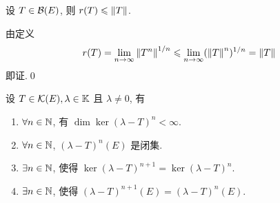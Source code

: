 	\begin{Corollary}
		设 $ T\in\mathcal{B}(E) $, 则 $ r(T)\leqslant\left\| T \right\| $.
	\end{Corollary}
	\begin{Proof}
		由定义
		\[
			r(T)=\lim_{n\to\infty}\left\| T^{n} \right\|^{1/n}\leqslant\lim_{n\to\infty}(\left\| T \right\|^{n})^{1/n}=\left\| T \right\|
		\]
		即证.\qed
	\end{Proof}
	
	\begin{Theorem}\label{thm:lambda-T的性质}
		设 $ T\in\mathcal{K}(E), \lambda\in\mathbb{K} $ 且 $ \lambda\ne0 $, 有
		\begin{enumerate}[(1)]
			\item $ \forall n\in\mathbb{N} $, 有 $ \dim\ker(\lambda-T)^{n}<\infty $.
			\item $ \forall n\in\mathbb{N} $, $ (\lambda-T)^{n}(E) $ 是闭集.
			\item $ \exists n\in\mathbb{N} $, 使得 $ \ker(\lambda-T)^{n+1}=\ker(\lambda-T)^{n} $.
			\item $ \exists n\in\mathbb{N} $, 使得 $ (\lambda-T)^{n+1}(E)=(\lambda-T)^{n}(E) $.
		\end{enumerate}
	\end{Theorem}

